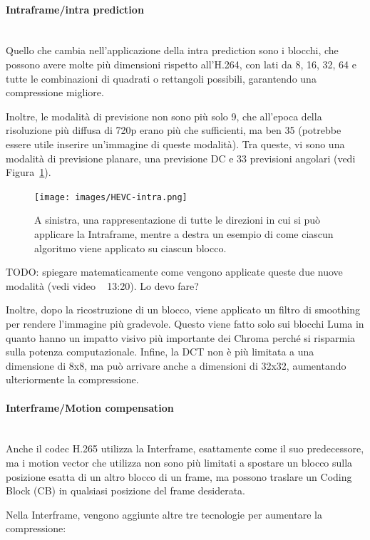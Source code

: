 \documentclass[a4paper,12pt, oneside]{article}
\begin{document}
\paragraph{Intraframe/intra prediction}\hphantom{A}\\
Quello che cambia nell'applicazione della intra prediction sono i blocchi, che possono avere molte più
dimensioni rispetto all'H.264, con lati da 8, 16, 32, 64 e tutte le combinazioni di quadrati o rettangoli
possibili, garantendo una compressione migliore.

Inoltre, le modalità di previsione non sono più solo 9, che all'epoca della risoluzione più diffusa di 720p
erano più che sufficienti, ma ben 35 (potrebbe essere utile inserire un'immagine di queste modalità). Tra
queste, vi sono una modalità di previsione planare, una previsione DC e 33 previsioni angolari (vedi
Figura~\ref{fig:HEVC_intra}).

\begin{figure}[h]
    \centering
    \texttt{[image: images/HEVC-intra.png]}
    \caption{A sinistra, una rappresentazione di tutte le direzioni in cui si può applicare la Intraframe,
    mentre a destra un esempio di come ciascun algoritmo viene applicato su ciascun blocco.}
    \label{fig:HEVC_intra}
\end{figure}

TODO: spiegare matematicamente come vengono applicate queste due nuove modalità (vedi video ~ 13:20). Lo devo fare?

Inoltre, dopo la ricostruzione di un blocco, viene applicato un filtro di smoothing per rendere
l'immagine più gradevole. Questo viene fatto solo sui blocchi Luma in quanto hanno un impatto visivo più
importante dei Chroma perché si risparmia sulla potenza computazionale.
Infine, la DCT non è più limitata a una dimensione di 8x8, ma può arrivare anche a dimensioni di 32x32,
aumentando ulteriormente la compressione.

\paragraph{Interframe/Motion compensation}\hphantom{A}\\
Anche il codec H.265 utilizza la Interframe, esattamente come il suo predecessore, ma i motion vector che
utilizza non sono più limitati a spostare un blocco sulla posizione esatta di un altro blocco di un frame,
ma possono traslare un Coding Block (CB) in qualsiasi posizione del frame desiderata.

Nella Interframe, vengono aggiunte altre tre tecnologie per aumentare la compressione:
\end{document}
